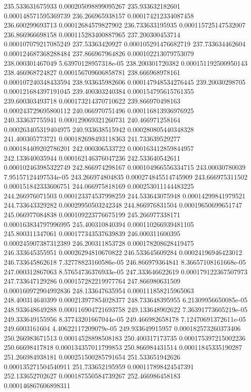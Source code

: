 {235.533631675933 0.000205098899095267
235.933632182601 0.000148571595369739
236.266965938157 0.000174212334087458
236.600299693713 0.00012684579827902
236.733633195935 0.000115725147532007
236.866966698158 0.000115283400887965
237.200300453714 0.000107079217085249
237.53363420927 0.000105291476682719
237.733634462604 0.000124687368288484
237.866967964826 0.000102213079753079
238.000301467049 5.63970128957318e-05
238.200301720382 0.000151192500950143
238.466968724827 0.000156709606858781
238.666968978161 0.000107240348433594
238.933635982606 0.000147948534276445
239.20030298705 0.000121684397191045
239.400303240384 0.000154795615761355
239.600303493718 0.000173214370710622
239.866970498163 0.000243729695800112
240.066970751496 0.000116813936976925
240.333637755941 0.000129069321260731
240.466971258164 0.000263405319404975
240.933638515942 0.000280805440348328
241.400305773721 0.000182698493118363
241.733639529277 0.000184409202786201
242.000306533722 0.000163412859844957
242.133640035944 0.000162146376047236
242.533640542611 0.000102463985322749
242.866974298167 0.000104966556334715
243.00030780039 7.95157124497534e-05
243.266974804835 0.000274845514745909
243.666975311502 0.000151842333606751
244.066975818169 0.000253011144483225
244.266976071503 0.000123374537998259
244.533643075948 0.00014299841979521
244.733643329282 0.00029950503242348
244.866976831504 0.00019650699651747
245.066977084838 0.000109223776675199
245.266977338171 0.000163834797996995
245.400310840394 0.000110266939481105
245.800311347061 0.000177343537639839
246.000311600395 0.000245907387312389
246.200311853728 0.000178208628419475
246.333645355951 0.00026294810670822
246.533645609284 0.00024196946423012
246.733645862618 7.32778823160586e-05
246.866979364841 8.36657108161668e-05
247.000312867063 8.57654736376933e-05
247.333646622619 0.000179122367507973
247.733647129286 0.000157282219977764
247.866980631509 0.000160972904992836
248.133647635954 0.000111858215965063
248.400314640399 0.000213977854028377
248.733648395955 6.21309956650085e-05
248.933648649288 0.000116904721693758
249.133648902622 7.36391773605219e-05
249.333649155956 8.37743201667044e-05
249.466982658178 7.12470691372611e-05
249.6003161604 4.40622117209079e-05
249.933649915957 0.000182573260373406
250.266983671513 0.00014528898508183
250.400317173735 0.000175397215002236
250.66698417818 0.000134357011799853
250.866984431514 0.00011845335190287
251.266984938181 0.000251500285791654
251.533651942626 0.000135271504540911
251.733652195959 0.000117898424547391
252.133652702627 0.000187550584739267
252.466986458183 0.000146867606898311
}
